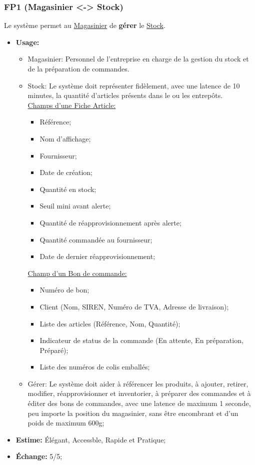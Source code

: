 \documentclass{article}
\begin{document}
\subsubsection{FP1 (Magasinier <-> Stock)}\label{cat:fp1}
Le système permet au \uline{Magasinier} de \textbf{gérer} le \uline{Stock}.
\begin{itemize}
	\item \textbf{Usage:} \begin{itemize}
		\item Magasinier: Personnel de l'entreprise en charge de la gestion du
			  stock et de la préparation de commandes.
		\item Stock: Le système doit représenter fidèlement, avec une latence de
			  10 minutes, la quantité d'articles présents dans le ou les
			  entrepôts.\\
			  \uline{Champs d'une Fiche Article:}
			  \begin{itemize}
				\item Référence;
				\item Nom d'affichage;
				\item Fournisseur;
				\item Date de création;
				\item Quantité en stock;
				\item Seuil mini avant alerte;
				\item Quantité de réapprovisionnement après alerte;
				\item Quantité commandée au fournisseur;
				\item Date de dernier réapprovisionnement;
			  \end{itemize}
			  \uline{Champ d'un Bon de commande:}
			  \begin{itemize}
				\item Numéro de bon;
				\item Client (Nom, SIREN, Numéro de TVA, Adresse de livraison);
				\item Liste des articles (Référence, Nom, Quantité);
				\item Indicateur de status de la commande (En attente, En
					  préparation, Préparé);
				\item Liste des numéros de colis emballés;
			  \end{itemize}
		\item Gérer: Le système doit aider à référencer les produits, à ajouter,
			  retirer, modifier, réapprovisionner et inventorier, à préparer des
			  commandes et à éditer des bons de commandes, avec une latence de
			  maximum 1 seconde, peu importe la position du magasinier, sans
			  être encombrant et d'un poids de maximum 600g;
	\end{itemize}
	\item \textbf{Estime:} Élégant, Accessble, Rapide et Pratique;
	\item \textbf{Échange:} 5/5;
\end{itemize}
\end{document}
